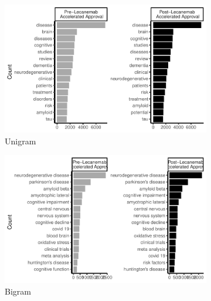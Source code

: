 \documentclass[
  a4paper,
]{article}
\begin{document}
\begin{figure}

{\centering 

\begin{figure}[H]

{\centering \includegraphics{report_pdf_files/figure-pdf/fig-tokenisation-1.pdf}

}

\caption{Unigram}

\end{figure}

\begin{figure}[H]

{\centering \includegraphics{report_pdf_files/figure-pdf/fig-tokenisation-2.pdf}

}

\caption{Bigram}

\end{figure}

\begin{figure}[H]


\end{figure}}
\end{figure}
\end{document}
